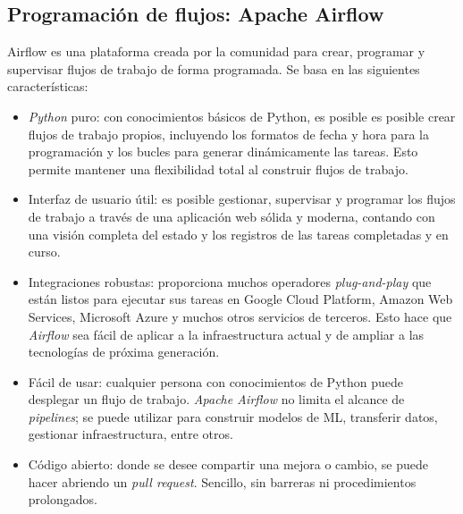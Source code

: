 \subsection{Programación de flujos: Apache Airflow}
Airflow es una plataforma creada por la comunidad para crear, programar y supervisar flujos de trabajo de forma programada. Se basa en las siguientes características:
\begin{itemize}
\item \textit{Python} puro: con conocimientos básicos de Python, es posible es posible crear flujos de trabajo propios, incluyendo los formatos de fecha y hora para la programación y los bucles para generar dinámicamente las tareas. Esto permite mantener una flexibilidad total al construir flujos de trabajo.
\item Interfaz de usuario útil: es posible gestionar, supervisar y programar los flujos de trabajo a través de una aplicación web sólida y moderna, contando con una visión completa del estado y los registros de las tareas completadas y en curso.
\item Integraciones robustas: proporciona muchos operadores \textit{plug-and-play} que están listos para ejecutar sus tareas en Google Cloud Platform, Amazon Web Services, Microsoft Azure y muchos otros servicios de terceros. Esto hace que \textit{Airflow} sea fácil de aplicar a la infraestructura actual y de ampliar a las tecnologías de próxima generación.
\item Fácil de usar: cualquier persona con conocimientos de Python puede desplegar un flujo de trabajo. \textit{Apache Airflow} no limita el alcance de \textit{pipelines}; se puede utilizar para construir modelos de ML, transferir datos, gestionar infraestructura, entre otros.
\item Código abierto: donde se desee compartir una mejora o cambio, se puede hacer abriendo un \textit{pull request}. Sencillo, sin barreras ni procedimientos prolongados.
\end{itemize}